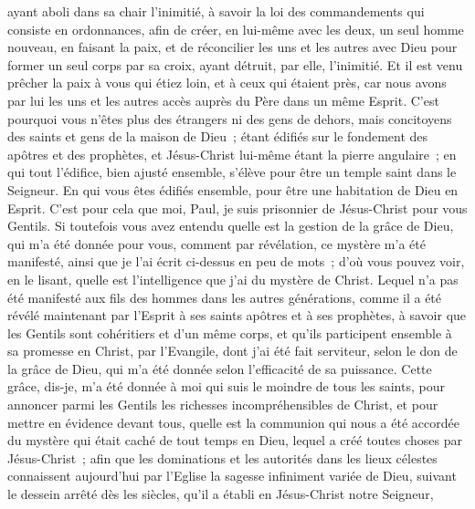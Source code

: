\begin{multicols}{2}
ayant aboli dans sa chair l'inimitié, à savoir la loi des commandements qui consiste en ordonnances, afin de créer, en lui-même avec les deux, un seul homme nouveau, en faisant la paix,
et de réconcilier les uns et les autres avec Dieu pour former un seul corps par sa croix, ayant détruit, par elle, l'inimitié.
Et il est venu prêcher la paix à vous qui étiez loin, et à ceux qui étaient près,
car nous avons par lui les uns et les autres accès auprès du Père dans un même Esprit.
C'est pourquoi vous n'êtes plus des étrangers ni des gens de dehors, mais concitoyens des saints et gens de la maison de Dieu~;
étant édifiés sur le fondement des apôtres et des prophètes, et Jésus-Christ lui-même étant la pierre angulaire~;
en qui tout l'édifice, bien ajusté ensemble, s'élève pour être un temple saint dans le Seigneur.
En qui vous êtes édifiés ensemble, pour être une habitation de Dieu en Esprit.
\VerseOne{}C'est pour cela que moi, Paul, je suis prisonnier de Jésus-Christ pour vous Gentils.
Si toutefois vous avez entendu quelle est la gestion de la grâce de Dieu, qui m'a été donnée pour vous,
comment par révélation, ce mystère m'a été manifesté, ainsi que je l'ai écrit ci-dessus en peu de mots~;
d'où vous pouvez voir, en le lisant, quelle est l'intelligence que j'ai du mystère de Christ.
Lequel n'a pas été manifesté aux fils des hommes dans les autres générations, comme il a été révélé maintenant par l'Esprit à ses saints apôtres et à ses prophètes,
à savoir que les Gentils sont cohéritiers et d'un même corps, et qu'ils participent ensemble à sa promesse en Christ, par l'Evangile,
dont j'ai été fait serviteur, selon le don de la grâce de Dieu, qui m'a été donnée selon l'efficacité de sa puissance.
Cette grâce, dis-je, m'a été donnée à moi qui suis le moindre de tous les saints, pour annoncer parmi les Gentils les richesses incompréhensibles de Christ,
et pour mettre en évidence devant tous, quelle est la communion qui nous a été accordée du mystère qui était caché de tout temps en Dieu, lequel a créé toutes choses par Jésus-Christ~;
afin que les dominations et les autorités dans les lieux célestes connaissent aujourd'hui par l'Eglise la sagesse infiniment variée de Dieu,
suivant le dessein arrêté dès les siècles, qu'il a établi en Jésus-Christ notre Seigneur,

\end{multicols}
